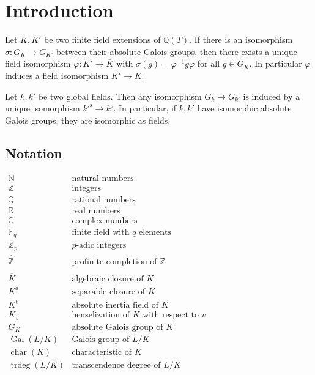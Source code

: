 \chapter{Introduction}

\begin{theorem}\label{thm:main-result}
Let $K,K'$ be two finite field extensions of $\mathbb{Q}(T)$. If there is an isomorphism $\sigma:G_K\to G_{K'}$ between their absolute Galois groups, then there exists a unique field isomorphism $\varphi:\overline{K'}\to\overline{K}$ with $\sigma(g)=\varphi^{-1}g\varphi$ for all $g\in G_K$. In particular $\varphi$ induces a field isomorphism $K'\to K$.
\end{theorem}

\begin{theorem}\label{thm:neukirch-uchida}
Let $k,k'$ be two global fields. Then any isomorphism $G_k\to G_{k'}$ is induced by a unique isomorphism $k'^{\text{s}}\to k^\text{s}$.  In particular, if $k,k'$ have isomorphic absolute Galois groups, they are isomorphic as fields.
\end{theorem}

\clearpage

\section{Notation}

$\begin{array}{ll}
\mathbb{N} & \text{natural numbers} \\
\mathbb{Z} & \text{integers}\\
\mathbb{Q} & \text{rational numbers}\\
\mathbb{R} & \text{real numbers}\\
\mathbb{C} & \text{complex numbers}\\
\mathbb{F}_q & \text{finite field with $q$ elements}\\
\mathbb{Z}_p & \text{$p$-adic integers}\\
\hat{\mathbb{Z}} & \text{profinite completion of $\mathbb{Z}$}\\
\\
\overline{K} & \text{algebraic closure of $K$}\\
K^\text{s} & \text{separable closure of $K$}\\
K^\text{t} & \text{absolute inertia field of $K$}\\
K_v & \text{henselization of $K$ with respect to $v$}\\
G_K & \text{absolute Galois group of $K$}\\
\operatorname{Gal}(L/K) & \text{Galois group of $L/K$}\\
\operatorname{char}(K) & \text{characteristic of $K$}\\
\operatorname{trdeg}(L/K) & \text{transcendence degree of $L/K$}
\end{array}$